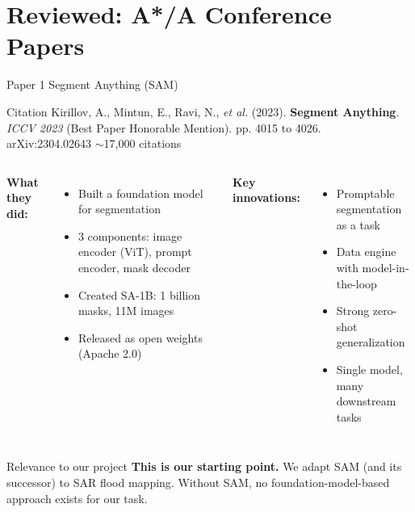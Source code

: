 \documentclass[10pt,aspectratio=169]{beamer}
\begin{document}
\section{Reviewed: A*/A Conference Papers}

\begin{frame}{Paper 1 \quad Segment Anything (SAM)}
\begin{block}{Citation}
Kirillov, A., Mintun, E., Ravi, N., \textit{et al.} (2023). \textbf{Segment Anything}. \textit{ICCV 2023} (Best Paper Honorable Mention). pp. 4015 to 4026. \\
\textcolor{primaryblue}{arXiv:2304.02643} \quad $\sim$17{,}000 citations
\end{block}

\begin{columns}[T,onlytextwidth]
\textbf{What they did:}
\begin{itemize}
\item Built a foundation model for segmentation
\item 3 components: image encoder (ViT), prompt encoder, mask decoder
\item Created SA-1B: 1 billion masks, 11M images
\item Released as open weights (Apache 2.0)
\end{itemize}

\textbf{Key innovations:}
\begin{itemize}
\item Promptable segmentation as a task
\item Data engine with model-in-the-loop
\item Strong zero-shot generalization
\item Single model, many downstream tasks
\end{itemize}
\end{columns}

\vspace{0.5em}
\begin{alertblock}{Relevance to our project}
\textbf{This is our starting point.} We adapt SAM (and its successor) to SAR flood mapping. Without SAM, no foundation-model-based approach exists for our task.
\end{alertblock}
\end{frame}
\end{document}
